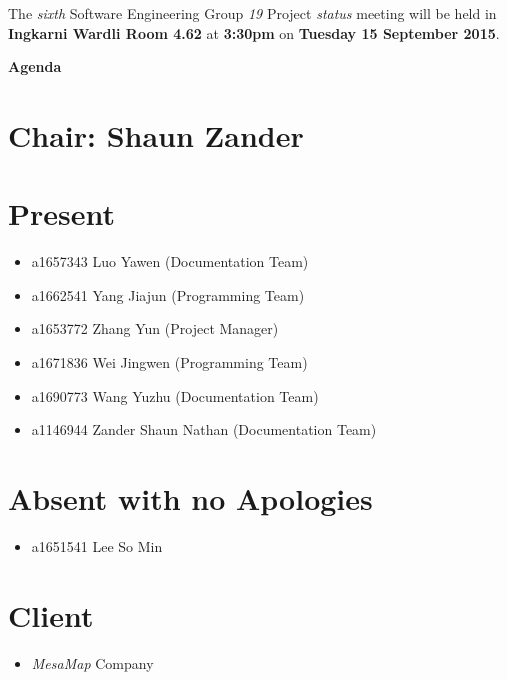\documentclass[a4paper] {article}
\begin{document}
	
	\vspace*{-50pt}
	
	\noindent The \emph{sixth} Software Engineering Group \emph{19} Project \emph{status} meeting will
	be held in \textbf{Ingkarni Wardli Room 4.62} at \textbf {3:30pm} on \textbf{Tuesday 15 September 2015}.
	
	
	\begin{center}
		\huge \textbf {Agenda}
	\end{center}
	

	\section*{Chair: Shaun Zander}
	
	\vspace*{10pt}
	
	\section{Present}
	\begin{itemize}
		\item a1657343 Luo Yawen (Documentation Team)
		\item a1662541 Yang Jiajun (Programming Team)
		\item a1653772 Zhang Yun (Project Manager)
		\item a1671836 Wei Jingwen (Programming Team)
		\item a1690773 Wang Yuzhu (Documentation Team)
		\item a1146944 Zander Shaun Nathan (Documentation Team)
	\end{itemize}
	
	\section{Absent with no Apologies}
	\begin{itemize}
		\item a1651541 Lee So Min
	\end{itemize}  
	
        \section{Client}
        \begin{itemize}
            \item \emph{MesaMap} Company
        \end{itemize} 
        
\end{document}
